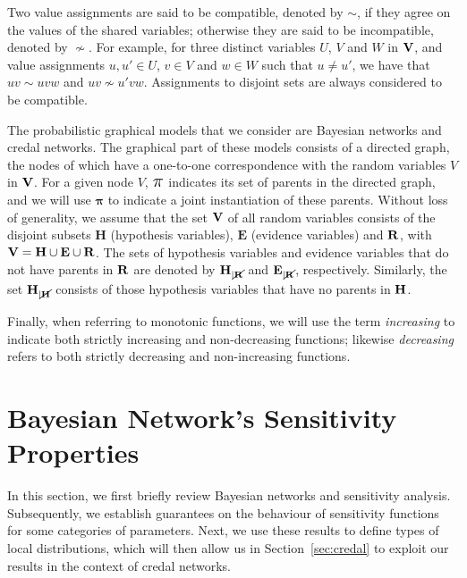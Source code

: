 \documentclass[10pt,a4paper]{paper}
\theoremstyle{definition}
\newcommand{\vbpi}{\boldsymbol\pi}
\newcommand{\vpi}{\scalebox{1.4}{\ensuremath\pi}}
\newcommand{\hyp}{\mathbf{h}}
\newcommand{\ev}{\mathbf{e}}
\newcommand{\hyps}{\mathbf{H}}
\newcommand{\evs}{\mathbf{E}}
\newcommand{\restr}{_{|\cancel{\bf R}}}
\newcommand{\newmid}{\hspace{0.9pt}\vert\hspace{0.9pt}}
\begin{document}
Two value assignments are said to be compatible, denoted by $\sim$, if they agree on the values of the shared variables; otherwise they are said to be incompatible, denoted by $\nsim$. For example, for three distinct variables $U$, $V$ and $W$ in ${\bf V}$, and value assignments $u,u'\in U$, $v\in V$ and $w\in W$ such that $u\neq u'$, we have that $u v \sim u v w$ and $u v \nsim u' v w$. Assignments to disjoint sets are always considered to be compatible.

The probabilistic graphical models that we consider are Bayesian networks and credal networks. The graphical part of these models consists of a directed graph, the nodes of which have a one-to-one correspondence with the random variables $V$ in ${\bf V}$. For a given node $V$, $\vpi$ indicates its set of parents in the directed graph, and we will use $\vbpi$ 
to indicate a joint instantiation of these parents. %
Without loss of generality, we assume that the set ${\bf V}$ of all random variables consists of  %
the disjoint subsets  $\hyps$ (hypothesis variables), $\evs$ (evidence variables) and  ${\bf R}$, with ${\bf V} = \hyps \cup \evs \cup {\bf R}$. %
The sets of hypothesis variables and evidence variables that do not have parents in ${\bf R}$ are denoted by $\hyps\restr$ and $\evs\restr$, respectively. Similarly, the set $\hyps_{|\cancel{\bf H}}$ consists of those hypothesis variables that have no parents in ${\bf H}$. 

Finally, when referring to monotonic functions, we will use the term \emph{increasing} to indicate both strictly increasing and non-decreasing functions; likewise \emph{decreasing} refers to both strictly decreasing and non-increasing functions.


\section{Bayesian Network's Sensitivity Properties}\label{sec:bayesian}
In this section, we first briefly review Bayesian networks and sensitivity analysis. Subsequently, we establish guarantees on the behaviour of sensitivity functions for some categories of parameters. Next, we use these results to define types of local distributions, which will then allow us in Section~\ref{sec:credal} to exploit our results in the context of credal networks.
\end{document}
